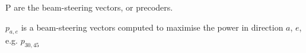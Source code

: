 P are the beam-steering vectors, or precoders.

$p_{a,e}$ is a beam-steering vectors computed to maximise the power in direction $a$, $e$, e.g. $p_{30, 45}$











